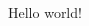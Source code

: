 \documentclass[10pt,landscape,a4paper]{cheatsheet}
\begin{document}
\begin{multicols*}{5}

	Hello world!

\end{multicols*}
\end{document}
